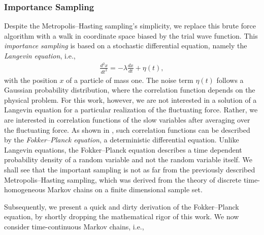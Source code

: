 \documentclass[11pt,a4paper]{article}
\numberwithin{equation}{section}
\begin{document}
\subsubsection{Importance Sampling}
%
%
Despite the Metropolis--Hasting sampling's simplicity, we replace this brute force algorithm with a walk in coordinate space biased by the trial wave function. 
%
This {\it importance sampling} is based on a stochastic differential equation, namely the {\it Langevin equation}, i.e.,
\begin{align*}
\frac{d^{2}x}{dt^{2}}=-\lambda \frac{dx}{dt}+\eta\left( t\right),
\end{align*}
with the position ${x}$ of a particle of mass one. 
%
The noise term $\eta \left(t\right)$ follows a Gaussian probability distribution, where the correlation function depends on the physical problem. 
%
For this work, however, we are not interested in a solution of a Langevin equation for a particular realization of the fluctuating force.
%
Rather, we are interested in correlation functions of the slow variables after averaging over the fluctuating force. 
%
As shown in \cite{risken1989fokker,coifman2008diffusion,ichimaru1973basic}, such correlation functions can be described by the {\it Fokker--Planck equation}, a deterministic differential equation. 
%
Unlike Langevin equations, the Fokker--Planck equation describes a time dependent probability density of a random variable and not the random variable itself.
%
We shall see that the important sampling is not as far from the previously described  Metropolis--Hasting sampling, which was derived from the theory of discrete time-homogeneous Markov chains on a finite dimensional sample set.

%
Subsequently, we present a quick and dirty derivation of the Fokker--Planck equation, by shortly dropping the mathematical rigor of this work. 
%
We now consider time-continuous Markov chains, i.e.,
\end{document}
